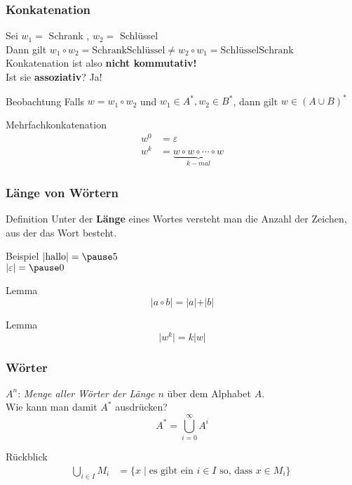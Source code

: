 \begin{frame}
	\frametitle{Konkatenation}
	\begin{block}{}
		Sei $w_1 = $ Schrank , $w_2 = $ Schlüssel \\
		Dann gilt $ w_1 \circ w_2 = \text{SchrankSchlüssel} \neq w_2 \circ w_1 = \text{SchlüsselSchrank}$\\ \pause
		Konkatenation ist also \textbf{nicht kommutativ!} \\
		Ist sie \textbf{assoziativ}? \pause Ja!		
	\end{block}

	\begin{block}{Beobachtung}
		Falls $w=w_1\circ w_2 $ und $w_1 \in A^* , w_2 \in B^* $, dann gilt
		$ w\in (A\cup B)^* $ 
	\end{block}

	\begin{block}{Mehrfachkonkatenation}
		\begin{align*}
			w^0 &= \varepsilon \\
			w^k &= \underbrace{w\circ w\circ \cdots \circ w}_{k-mal}
		\end{align*}

	\end{block}

\end{frame}

\begin{frame}
	\frametitle{Länge von Wörtern}
	\begin{block}{Definition}
		Unter der \textbf{Länge} eines Wortes versteht man die Anzahl der Zeichen, aus der das Wort besteht.
	\end{block}

	
	\begin{block}{Beispiel}
		$ \vert \text{hallo} \vert = \pause 5 $ \\
		$ \vert \varepsilon \vert = \pause 0 $
	\end{block}

	\pause
	\begin{block}{Lemma}
		$$ \vert a\circ b \vert = \vert a \vert + \vert b \vert $$
	\end{block}

	\pause
	\begin{block}{Lemma}
		$$ \vert w^k \vert = k \vert w \vert $$
	\end{block}
\end{frame}

\begin{frame}
	\frametitle{Wörter}
	$A^n$: \emph{Menge aller Wörter der Länge $n$} über dem Alphabet $A$.\\
	Wie kann man damit $A^*$ ausdrücken? \\
	\pause
	\[ A^\ast = \bigcup \limits_{i = 0}^\infty A^i \]
	
	\pause
	\begin{block}{Rückblick}
		\begin{align*}
		\bigcup_{i\in I} M_i &= \{ x \mid \text{es gibt ein } i\in I \text{ so, dass } x\in  M_i \}  \;
		\end{align*}
	\end{block}
\end{frame}

